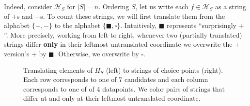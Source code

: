 \documentclass[twocolumn]{article}
\newcommand{\Hh}{\mathcal{H}}
\theoremstyle{definition}
\begin{document}
    Indeed, consider $\Hh_S$ for $|S|=n$.  Ordering $S$,
    let us write each $f\in \Hh_S$ as a string of $+$s
    and $-$s.  To count these strings, we will first translate them from the
    alphabet $\{+,-\}$ to the alphabet $\{\blacksquare,\square\}$.
    Intuitively, $\blacksquare$ represents ``surprisingly $+$''.
    More precisely, working from left to right, whenever two
    (partially translated) strings differ \textbf{only} in their
    leftmost untranslated coordinate we overwrite the $+$ version's
    $+$ by $\blacksquare$.  Otherwise, we overwrite by $\square$.

    \newcommand{\rR}[1]{{\color{moor}#1}}
    \newcommand{\gG}[1]{{\color{moog}#1}}
    \newcommand{\bB}[1]{{\color{moob}#1}}
    \newcommand{\E}{\texttt{$\square$}}
    \newcommand{\D}{\texttt{$\blacksquare$}}
    \newcommand{\A}{\texttt{$\bm{+}$}}
    \newcommand{\M}{\texttt{$\bm{-}$}}
    \begin{figure}[h]
        \centering
        \resizebox{\columnwidth}{!}{
            \begin{tabular}{ccccccccc}
                   \A \M \M \M  &       &  \E \gG\M \M \M  &       &  \E \E \rR\M \M  &       &  \E \E \E \rR\M  &       &  \E \E \E \E  \\
                   \M \A \M \M  &       &  \E \gG\A \M \M  &       &  \E \D    \M \M  &       &  \E \D \E \bB\M  &       &  \E \D \E \E  \\
                   \M \M \A \M  &       &  \E    \M \A \M  &       &  \E \E \rR\A \M  &       &  \E \E \D \gG\M  &       &  \E \E \D \E  \\
                   \M \M \M \A  & $\to$ &  \E    \M \M \A  & $\to$ &  \E \E \gG\M \A  & $\to$ &  \E \E \E \rR\A  & $\to$ &  \E \E \E \D  \\
                   \M \M \A \A  &       &  \E \bB\M \A \A  &       &  \E \E \gG\A \A  &       &  \E \E \D \gG\A  &       &  \E \E \D \D  \\
                \rR\M \A \A \A  &       &  \E \bB\A \A \A  &       &  \E \D    \A \A  &       &  \E \D \E \bB\A  &       &  \E \D \E \D  \\
                \rR\A \A \A \A  &       &  \D    \A \A \A  &       &  \D \E    \A \A  &       &  \D \E \E    \A  &       &  \D \E \E \E
            \end{tabular}
        }
        \caption{
            Translating elements of $H_S$ (left) to strings of choice points
            (right).  Each row corresponds to one of $7$ candidates and each
            column corresponds to one of of $4$ datapoints.
            We color pairs of strings that differ at-and-only-at their leftmost
            untranslated coordinate.
        }
        \label{fig:sauer}
    \end{figure}
\end{document}
